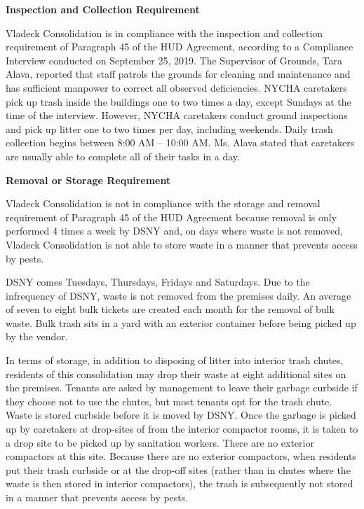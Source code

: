 

\textbf{Inspection and Collection Requirement}

Vladeck Consolidation is in compliance with the inspection and collection requirement of  Paragraph 45 of the HUD Agreement, according to a Compliance Interview conducted on September 25, 2019. The Supervisor of Grounds, Tara Alava, reported that staff patrols the grounds for cleaning and maintenance and has sufficient manpower to correct all observed deficiencies. NYCHA caretakers pick up trash inside the buildings one to two times a day, except Sundays at the time of the interview. However, NYCHA caretakers conduct ground inspections and pick up litter one to two times per day, including weekends. Daily trash collection begins between 8:00 AM -- 10:00 AM. Ms. Alava stated that caretakers are usually able to complete all of their tasks in a day.

\textbf{Removal or Storage Requirement}

Vladeck Consolidation is not in compliance with the storage and removal requirement of Paragraph 45 of the HUD Agreement because removal is only performed 4 times a week by DSNY and, on days where waste is not removed, Vladeck Consolidation is not able to store waste in a manner that prevents access by pests. 

DSNY comes Tuesdays, Thursdays, Fridays and Saturdays. Due to the infrequency of DSNY, waste is not removed from the premises daily. An average of seven to eight bulk tickets are created each month for the removal of bulk waste. Bulk trash sits in a yard with an exterior container before being picked up by the vendor.

In terms of storage, in addition to disposing of litter into interior trash chutes, residents of this consolidation may drop their waste at eight additional sites on the premises. Tenants are asked by management to leave their garbage curbside if they choose not to use the chutes, but most tenants opt for the trash chute. Waste is stored curbside before it is moved by DSNY. Once the garbage is picked up by caretakers at drop-sites of from the interior compactor rooms, it is taken to a drop site to be picked up by sanitation workers. There are no exterior compactors at this site. Because there are no exterior compactors, when residents put their trash curbside or at the drop-off sites (rather than in chutes where the waste is then stored in interior compactors), the trash is subsequently not stored in a manner that prevents access by pests.

